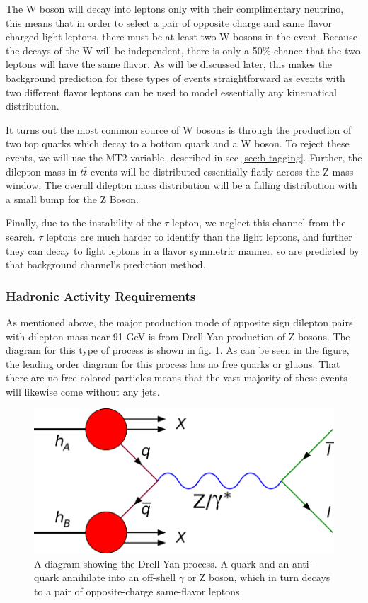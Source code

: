       The W boson will decay into leptons only with their complimentary neutrino, this means that in order to select a pair of opposite charge and same flavor charged light leptons, there must be at least two W bosons in the event. Because the decays of the W will be independent, there is only a 50\% chance that the two leptons will have the same flavor. As will be discussed later, this makes the background prediction for these types of events straightforward as events with two different flavor leptons can be used to model essentially any kinematical distribution.

      It turns out the most common source of W bosons is through the production of two top quarks which decay to a bottom quark and a W boson. To reject these events, we will use the MT2 variable, described in sec \ref{sec:b-tagging}. Further, the dilepton mass in $t\bar{t}$ events will be distributed essentially flatly across the Z mass window. The overall dilepton mass distribution will be a falling distribution with a small bump for the Z Boson. 

      Finally, due to the instability of the $\tau$ lepton, we neglect this channel from the search. $\tau$ leptons are much harder to identify than the light leptons, and further they can decay to light leptons in a flavor symmetric manner, so are predicted by that background channel's prediction method.

    \subsubsection{Hadronic Activity Requirements}
      As mentioned above, the major production mode of opposite sign dilepton pairs with dilepton mass near 91 GeV is from Drell-Yan production of Z bosons. The diagram for this type of process is shown in fig. \ref{fig:DY-diagram}. As can be seen in the figure, the leading order diagram for this process has no free quarks or gluons. That there are no free colored particles means that the vast majority of these events will likewise come without any jets. 

      \begin{figure}[h!]
        \centering
        \includegraphics[width=.5\textwidth]{figures/Drell-Yan_feynman_edit.png}
        \caption{A diagram showing the Drell-Yan process. A quark and an anti-quark annihilate into an off-shell $\gamma$ or Z boson, which in turn decays to a pair of opposite-charge same-flavor leptons.}
        \label{fig:DY-diagram}
      \end{figure}


